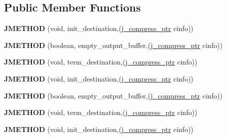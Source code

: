 \subsection*{Public Member Functions}
\begin{DoxyCompactItemize}
\item 
\mbox{\label{structjpeg__destination__mgr_ae29d14eb632140c7c67eda8c5824383c}} 
{\bfseries J\+M\+E\+T\+H\+OD} (void, init\+\_\+destination,(\hyperlink{structjpeg__compress__struct}{j\+\_\+compress\+\_\+ptr} cinfo))
\item 
\mbox{\label{structjpeg__destination__mgr_a7357b5d5cab543cfa243dd59f101b8f2}} 
{\bfseries J\+M\+E\+T\+H\+OD} (boolean, empty\+\_\+output\+\_\+buffer,(\hyperlink{structjpeg__compress__struct}{j\+\_\+compress\+\_\+ptr} cinfo))
\item 
\mbox{\label{structjpeg__destination__mgr_a1158df5e49ecfa2a7d0905eef216afbf}} 
{\bfseries J\+M\+E\+T\+H\+OD} (void, term\+\_\+destination,(\hyperlink{structjpeg__compress__struct}{j\+\_\+compress\+\_\+ptr} cinfo))
\item 
\mbox{\label{structjpeg__destination__mgr_ae29d14eb632140c7c67eda8c5824383c}} 
{\bfseries J\+M\+E\+T\+H\+OD} (void, init\+\_\+destination,(\hyperlink{structjpeg__compress__struct}{j\+\_\+compress\+\_\+ptr} cinfo))
\item 
\mbox{\label{structjpeg__destination__mgr_a7357b5d5cab543cfa243dd59f101b8f2}} 
{\bfseries J\+M\+E\+T\+H\+OD} (boolean, empty\+\_\+output\+\_\+buffer,(\hyperlink{structjpeg__compress__struct}{j\+\_\+compress\+\_\+ptr} cinfo))
\item 
\mbox{\label{structjpeg__destination__mgr_a1158df5e49ecfa2a7d0905eef216afbf}} 
{\bfseries J\+M\+E\+T\+H\+OD} (void, term\+\_\+destination,(\hyperlink{structjpeg__compress__struct}{j\+\_\+compress\+\_\+ptr} cinfo))
\item 
\mbox{\label{structjpeg__destination__mgr_ae29d14eb632140c7c67eda8c5824383c}} 
{\bfseries J\+M\+E\+T\+H\+OD} (void, init\+\_\+destination,(\hyperlink{structjpeg__compress__struct}{j\+\_\+compress\+\_\+ptr} cinfo))

\end{DoxyCompactItemize}
